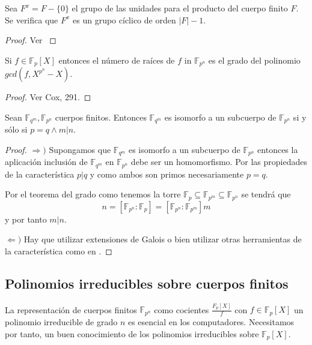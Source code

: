 \begin{proposition}
	Sea $F^x = F - \{0\}$ el grupo de las unidades para el producto del cuerpo finito $F$. Se verifica que $F^x$ es un grupo cíclico de orden $|F|-1$. 
\end{proposition}
\begin{proof}
	Ver \cite{link2}
\end{proof}

\begin{proposition}
	Si $f \in \mathbb{F}_p[X]$ entonces el número de raíces de $f$ in $\mathbb{F}_{p^n}$ es el grado del polinomio $gcd(f,X^{p^n}-X)$.
\end{proposition}
\begin{proof}
	Ver Cox, 291.
\end{proof}

\begin{proposition}
	Sean $\mathbb{F}_{q^m}, \mathbb{F}_{p^n}$ cuerpos finitos. Entonces $\mathbb{F}_{q^m}$ es isomorfo a un subcuerpo de $\mathbb{F}_{p^n}$ si y sólo si $p = q \land m|n$. 
\end{proposition}
\begin{proof}
	$\Rightarrow)$ Supongamos que $\mathbb{F}_{q^m}$ es isomorfo a un subcuerpo de $\mathbb{F}_{p^n}$ entonces la aplicación inclusión de $\mathbb{F}_{q^m}$ en $\mathbb{F}_{p^n}$ debe ser un homomorfismo. Por las propiedades de la característica $p|q$ y como ambos son primos necesariamente $p = q$. 
	
	Por el teorema del grado como tenemos la torre $\mathbb{F}_{p} \subseteq \mathbb{F}_{p^m} \subseteq \mathbb{F}_{p^n}$ se tendrá que $$n = [\mathbb{F}_{p^n}:\mathbb{F}_{p}] = [\mathbb{F}_{p^n}:\mathbb{F}_{p^m}]m$$ y por tanto $m|n$. 
	
	$\Leftarrow)$ Hay que utilizar extensiones de Galois o bien utilizar otras herramientas de la característica como en \cite{4}.
\end{proof}


\subsection{Polinomios irreducibles sobre cuerpos finitos}

La representación de cuerpos finitos $\mathbb{F}_{p^n}$ como cocientes $\frac{F_p[X]}{f}$ con $f \in \mathbb{F}_p[X]$ un polinomio irreducible de grado $n$ es esencial en los computadores. Necesitamos por tanto, un buen conocimiento de los polinomios irreducibles sobre $\mathbb{F}_p[X]$.

